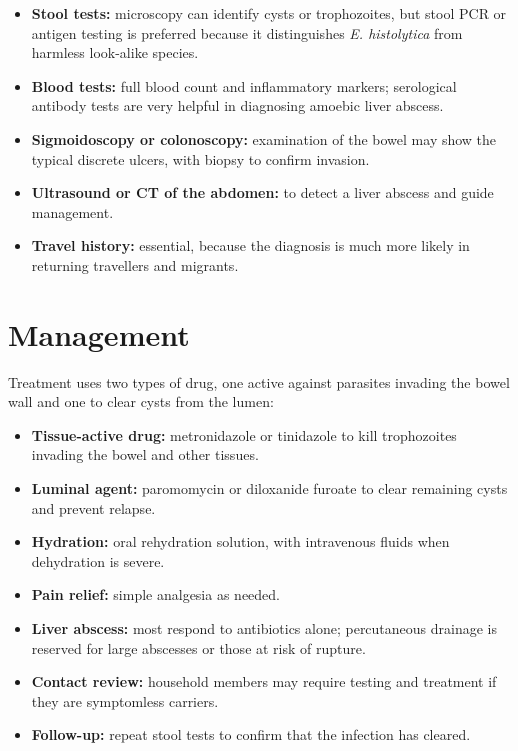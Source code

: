 \begin{itemize}
    \item \textbf{Stool tests:} microscopy can identify cysts or trophozoites, but stool PCR or antigen testing is preferred because it distinguishes \textit{E. histolytica} from harmless look-alike species.
    \item \textbf{Blood tests:} full blood count and inflammatory markers; serological antibody tests are very helpful in diagnosing amoebic liver abscess.
    \item \textbf{Sigmoidoscopy or colonoscopy:} examination of the bowel may show the typical discrete ulcers, with biopsy to confirm invasion.
    \item \textbf{Ultrasound or CT of the abdomen:} to detect a liver abscess and guide management.
    \item \textbf{Travel history:} essential, because the diagnosis is much more likely in returning travellers and migrants.
\end{itemize}

\section*{Management}
Treatment uses two types of drug, one active against parasites invading the bowel wall and one to clear cysts from the lumen:

\begin{itemize}
    \item \textbf{Tissue-active drug:} metronidazole or tinidazole to kill trophozoites invading the bowel and other tissues.
    \item \textbf{Luminal agent:} paromomycin or diloxanide furoate to clear remaining cysts and prevent relapse.
    \item \textbf{Hydration:} oral rehydration solution, with intravenous fluids when dehydration is severe.
    \item \textbf{Pain relief:} simple analgesia as needed.
    \item \textbf{Liver abscess:} most respond to antibiotics alone; percutaneous drainage is reserved for large abscesses or those at risk of rupture.
    \item \textbf{Contact review:} household members may require testing and treatment if they are symptomless carriers.
    \item \textbf{Follow-up:} repeat stool tests to confirm that the infection has cleared.
\end{itemize}

